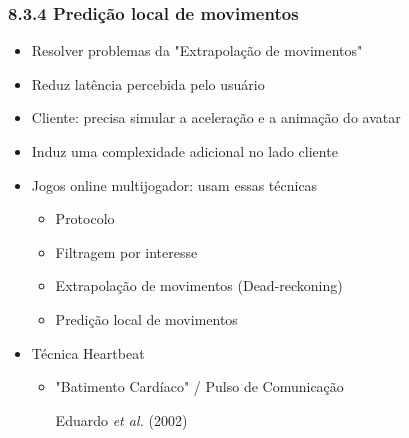 \documentclass{beamer}
\begin{document}
\begin{frame}
  \frametitle{8.3.4 Predição local de movimentos}
  \begin{itemize}
    \item Resolver problemas da "Extrapolação de movimentos"
    \item Reduz latência percebida pelo usuário
    \item Cliente: precisa simular a aceleração e a animação do avatar
    \item Induz uma complexidade adicional no lado cliente
    \item Jogos online multijogador: usam essas técnicas
    \begin{itemize}
      \item Protocolo
      \item Filtragem por interesse
      \item Extrapolação de movimentos (Dead-reckoning)
      \item Predição local de movimentos
    \end{itemize}
    \item Técnica Heartbeat
    \begin{itemize}
      \item "Batimento Cardíaco" / Pulso de Comunicação
      \begin{flushright}
        \scriptsize
          Eduardo \textit{et al.} (2002)
      \end{flushright}
    \end{itemize}
  \end{itemize}
\end{frame}
\end{document}
